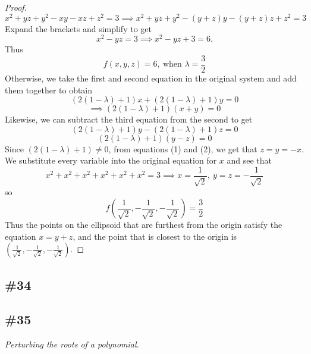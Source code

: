 \documentclass{article}
\theoremstyle{plain} %
\numberwithin{thm}{section} %
\theoremstyle{definition}
\begin{document}
\begin{proof}
        \[
            x^2 + yz + y^2 - xy - xz + z^2 = 3 \implies x^2 + yz + y^2 - (y + z)y - (y + z)z + z^2 = 3
        \]
        Expand the brackets and simplify to get
        \[
            x^2 - yz = 3 \implies x^2 - yz + 3 = 6.
        \]
        Thus
        \[
            f(x,y,z) = 6,\ \text{when } \lambda = \frac{3}{2}
        \]
        Otherwise, we take the first and second equation in the original system and add them together to obtain
        \[
            (2(1 - \lambda) + 1)x + (2(1 - \lambda) + 1)y = 0
        \]
        \[
            \implies (2(1 - \lambda) + 1)(x + y) = 0 \tag{1}
        \]
        Likewise, we can subtract the third equation from the second to get
        \[
            (2(1 - \lambda) + 1)y - (2(1 - \lambda) + 1)z = 0
        \]
        \[
            (2(1 - \lambda) + 1)(y - z) = 0 \tag{2}
        \]
        Since \((2(1 - \lambda) + 1) \neq 0\), from equations (1) and (2), we get that \(z = y = -x\). We substitute every variable into the original equation for \(x\) and see that
        \[
            x^2 + x^2 + x^2 + x^2 + x^2 + x^2 = 3 \implies x = \frac{1}{\sqrt{2}},\ y = z = -\frac{1}{\sqrt{2}}
        \]
        so
        \[
            f \left( \frac{1}{\sqrt{2}}, -\frac{1}{\sqrt{2}}, -\frac{1}{\sqrt{2}} \right) = \frac{3}{2}
        \]
        Thus the points on the ellipsoid that are furthest from the origin satisfy the equation \(x = y + z\), and the point that is closest to the origin is \(\left( \frac{1}{\sqrt{2}}, -\frac{1}{\sqrt{2}}, -\frac{1}{\sqrt{2}} \right)\).
        \end{proof}
        \newpage
        \subsection{\#34}
        \newpage
        \subsection{\#35}
        \textit{Perturbing the roots of a polynomial.}
    
\end{document}
